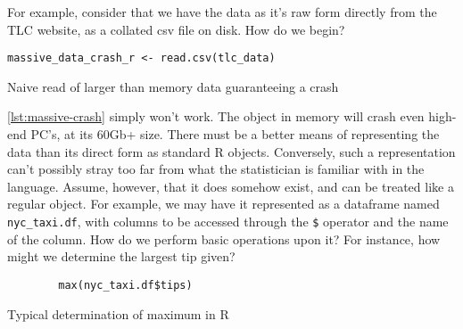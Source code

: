 For example, consider that we have the data as it's raw form directly
from the TLC website, as a collated csv file on disk. How do we begin?

\begin{listing}
    \begin{verbatim}
massive_data_crash_r <- read.csv(tlc_data)
\end{verbatim}
    \caption{Naive read of larger than memory data guaranteeing a crash}
    \label{lst:massive-crash}
\end{listing}

\ref{lst:massive-crash} simply won't work. The object in memory will crash even high-end
PC's, at its 60Gb+ size. There must be a better means of representing
the data than its direct form as standard R objects. Conversely, such a
representation can't possibly stray too far from what the statistician
is familiar with in the language. Assume, however, that it does somehow
exist, and can be treated like a regular object. For example, we may
have it represented as a dataframe named \texttt{nyc\_taxi.df}, with
columns to be accessed through the \texttt{\$} operator and the name of
the column. How do we perform basic operations upon it? For instance,
how might we determine the largest tip given?

\begin{listing}
    \begin{verbatim}
        max(nyc_taxi.df$tips)
\end{verbatim}
    \caption{Typical determination of maximum in R}
    \label{lst:max-tip}
\end{listing}


